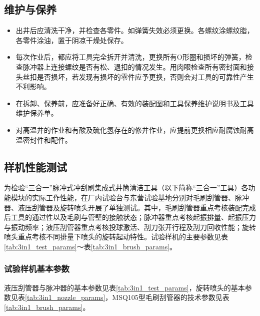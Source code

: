 
\subsection{维护与保养}
\begin{itemize}
	\item 	出井后应清洗干净，并检查各零件。如弹簧失效必须更换。各螺纹涂螺纹脂，各零件涂油，置于阴凉干燥处保存。
\item 	 每次作业后，都应将工具完全拆开并清洗，更换所有O形圈和损坏的弹簧，检查脉冲器上连接螺纹是否有松、退扣的情况发生。用肉眼检查所有密封面和接头丝扣是否损坏，若发现有损坏的零件应予更换，否则会对工具的可靠性产生不利影响。
\item 	在拆卸、保养前，应准备好正确、有效的装配图和工具保养维护说明书及工具维护保养单。
\item 	对高温井的作业和有酸及硫化氢存在的修井作业，应提前更换相应耐腐蚀耐高温密封件和配件。
\end{itemize}

\subsection{样机性能测试}
\label{subsec:3in1_performance_test}

为检验“三合一”脉冲式冲刮刷集成式井筒清洁工具（以下简称“三合一”工具）各功能模块的实际工作性能，在厂内试验台与东营试验基地分别对毛刷刮管器、脉冲器、液压刮管器及旋转喷头开展了单独测试。其中，毛刷刮管器重点考核装配完成后工具的通过性以及毛刷与管壁的接触状态；脉冲器重点考核起振排量、起振压力与振动频率；液压刮管器重点考核投球激活、刮刀张开行程及刮刀回收性能；旋转喷头重点考核不同排量下喷头的旋转起动特性。试验样机的主要参数见表\ref{tab:3in1_test_params}～表\ref{tab:3in1_brush_params}。

\subsubsection{试验样机基本参数}

液压刮管器与脉冲器的基本参数见表\ref{tab:3in1_test_params}，旋转喷头的基本参数见表\ref{tab:3in1_nozzle_params}，MSQ105型毛刷刮管器的技术参数见表\ref{tab:3in1_brush_params}。

